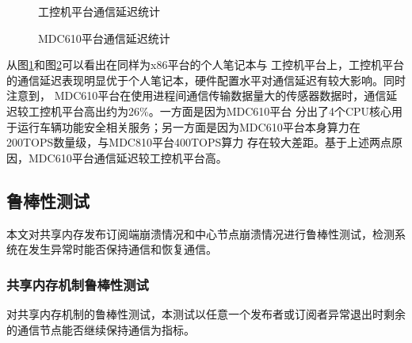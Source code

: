 \begin{figure}[H]
  \centering
  \caption{工控机平台通信延迟统计}
  \label{x86_latency_statistic}
\end{figure}

\begin{figure}[H]
  \centering
  \caption{MDC610平台通信延迟统计}
  \label{mdc_latency_statistic}
\end{figure}

从图\ref{x86_latency_statistic}和图\ref{mdc_latency_statistic}可以看出在同样为x86平台的个人笔记本与
工控机平台上，工控机平台的通信延迟表现明显优于个人笔记本，硬件配置水平对通信延迟有较大影响。同时注意到，
MDC610平台在使用进程间通信传输数据量大的传感器数据时，通信延迟较工控机平台高出约为26\%。一方面是因为MDC610平台
分出了4个CPU核心用于运行车辆功能安全相关服务；另一方面是因为MDC610平台本身算力在200TOPS数量级，与MDC810平台400TOPS算力
存在较大差距。基于上述两点原因，MDC610平台通信延迟较工控机平台高。

\subsection{鲁棒性测试}
本文对共享内存发布订阅端崩溃情况和中心节点崩溃情况进行鲁棒性测试，检测系统在发生异常时能否保持通信和恢复通信。
\subsubsection{共享内存机制鲁棒性测试}
对共享内存机制的鲁棒性测试，本测试以任意一个发布者或订阅者异常退出时剩余的通信节点能否继续保持通信为指标。


